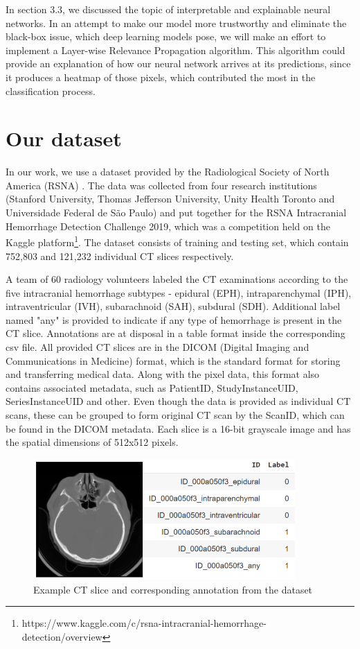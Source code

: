 In section 3.3, we discussed the topic of interpretable and explainable neural networks. In an attempt to make our model more trustworthy and eliminate the black-box issue, which deep learning models pose, we will make an effort to implement a Layer-wise Relevance Propagation algorithm. This algorithm could provide an explanation of how our neural network arrives at its predictions, since it produces a heatmap of those pixels, which contributed the most in the classification process.




\section{Our dataset}
In our work, we use a dataset provided by the Radiological Society of North America (RSNA)  \cite{RSNAchallenge}. The data was collected from four research institutions (Stanford University, Thomas Jefferson University, Unity Health Toronto and Universidade Federal de São Paulo) and put together for the RSNA Intracranial Hemorrhage Detection Challenge 2019, which was a competition held on the Kaggle platform\footnote{https://www.kaggle.com/c/rsna-intracranial-hemorrhage-detection/overview}. The dataset consists of training and testing set, which contain 752,803 and 121,232 individual CT slices respectively. 


A team of 60 radiology volunteers labeled the CT examinations according to the five intracranial hemorrhage subtypes - epidural (EPH), intraparenchymal (IPH), intraventricular (IVH), subarachnoid (SAH), subdural (SDH). Additional label named "any" is provided to indicate if any type of hemorrhage is present in the CT slice. Annotations are at disposal in a table format inside the corresponding csv file. All provided CT slices are in the DICOM (Digital Imaging and Communications in Medicine) format, which is the standard format for storing and transferring medical data. Along with the pixel data, this format also contains associated metadata, such as PatientID, StudyInstanceUID, SeriesInstanceUID and other. Even though the data is provided as individual CT scans, these can be grouped to form original CT scan by the ScanID, which can be found in the DICOM metadata. Each slice is a 16-bit grayscale image and has the spatial dimensions of 512x512 pixels. 
\begin{figure}[h]
\centering
\includegraphics[width=10cm]{assets/images/datasetExample}
\caption{Example CT slice and corresponding annotation from the dataset \label{fig:dataset}}
\end{figure}

